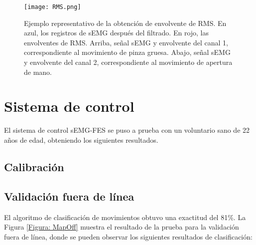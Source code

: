 
\begin{figure}[htbp]
	\centering
	\texttt{[image: RMS.png]}
	\caption[Ejemplo representativo de la obtención de envolvente de RMS]{Ejemplo representativo de la obtención de envolvente de RMS. En azul, los registros de sEMG después del filtrado. En rojo, las envolventes de RMS. Arriba, señal sEMG y envolvente del canal 1, correspondiente al movimiento de pinza gruesa. Abajo, señal sEMG y envolvente del canal 2, correspondiente al movimiento de apertura de mano.}
	\label{Figura: RMS}
\end{figure}


\newpage
\section{Sistema de control}
El sistema de control sEMG-FES se puso a prueba con un voluntario sano de 22 años de edad, obteniendo los siguientes resultados.

\subsection{Calibración}

\subsection{Validación fuera de línea}
El algoritmo de clasificación de movimientos obtuvo una exactitud del 81\%. La Figura \ref{Figura: MapOff} muestra el resultado de la prueba para la validación fuera de línea, donde se pueden observar los siguientes resultados de clasificación:

